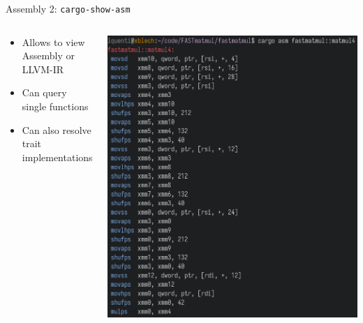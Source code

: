 \documentclass[compress,aspectratio=169]{beamer}
\begin{document}
\begin{frame}{Assembly 2: \texttt{cargo-show-asm} \cite{cargo-asm}}
  \begin{columns}
    \begin{column}{0.5\textwidth}
      \begin{itemize}
        \item Allows to view Assembly or LLVM-IR
        \item Can query single functions
        \item Can also resolve trait implementations
      \end{itemize}
    \end{column}
    \begin{column}{0.5\textwidth}
    \includegraphics[height=.9\textheight]{../assets/cargoasm.png}
    \end{column}
  \end{columns}
\end{frame}
\end{document}
